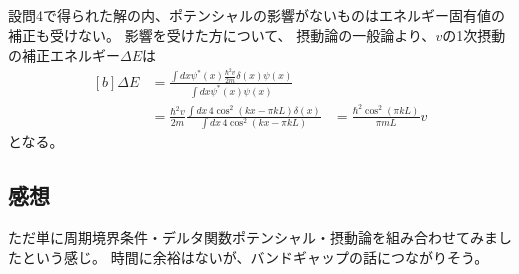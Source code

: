 \documentclass[../../sp_2014.tex]{subfiles}
\begin{document}
\subsection{}
設問4で得られた解の内、ポテンシャルの影響がないものはエネルギー固有値の補正も受けない。
影響を受けた方について、
摂動論の一般論より、\(v\)の1次摂動の補正エネルギー\(\Delta E\)は
\begin{equation}\begin{aligned}[b]
    \Delta E &= \frac{\int dx \psi^*(x)\frac{\hbar^2v}{2m}\delta(x)\psi(x)}{\int dx \psi^*(x)\psi(x)}\\
    &= \frac{\hbar^2 v}{2m}\frac{\int dx \,4\cos^2(kx-\pi kL)\delta(x)}{\int dx \,4\cos^2(kx-\pi kL)}
    &= \frac{\hbar^2\cos^2(\pi kL)}{\pi mL}v
\end{aligned}\end{equation}
となる。

\subsection*{感想}
ただ単に周期境界条件・デルタ関数ポテンシャル・摂動論を組み合わせてみましたという感じ。
時間に余裕はないが、バンドギャップの話につながりそう。
\end{document}
